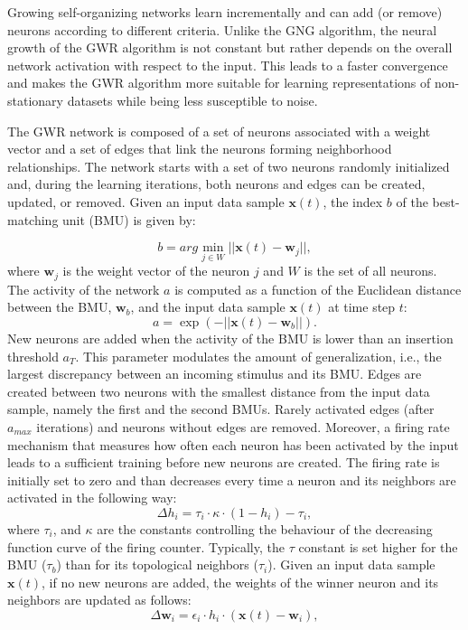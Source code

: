 \documentclass[5p,times]{elsarticle}
\begin{document}
Growing self-organizing networks learn incrementally and can add (or remove) neurons according to different criteria.
Unlike the GNG algorithm, the neural growth of the GWR algorithm is not constant but rather depends on the overall network activation with respect to the input. 
This leads to a faster convergence and makes the GWR algorithm more suitable for learning representations of non-stationary datasets while being less susceptible to noise.

The GWR network is composed of a set of neurons associated with a weight vector and a set of edges that link the neurons forming neighborhood relationships.
The network starts with a set of two neurons randomly initialized and, during the learning iterations, both neurons and edges can be created, updated, or removed.
Given an input data sample $\textbf{x}(t)$, the index $b$ of the best-matching unit (BMU) is given by:

\begin{equation}\label{eq:bmu}
b = arg \min\limits_{j \in W} ||\textbf{x}(t) - \textbf{w}_j||,
\end{equation}
where $\textbf{w}_j$ is the weight vector of the neuron $j$ and $W$ is the set of all neurons.
The activity of the network $a$ is computed as a function of the Euclidean distance between the BMU, $\textbf{w}_b$, and the input data sample $\textbf{x}(t)$ at time step $t$:
\begin{equation}\label{eq:activation}
a = \exp ( { - ||\textbf{x}(t) - \textbf{w}_b|| } ).
\end{equation}
\noindent New neurons are added when the activity of the BMU is lower than an insertion threshold $a_T$.
This parameter modulates the amount of generalization, i.e., the largest discrepancy between an incoming stimulus and its BMU.
Edges are created between two neurons with the smallest distance from the input data sample, namely the first and the second BMUs.
Rarely activated edges (after $a_{max}$ iterations) and neurons without edges are removed.
Moreover, a firing rate mechanism that measures how often each neuron has been activated by the input leads to a sufficient training before new neurons are created. 
The firing rate is initially set to zero and than decreases every time a neuron and its neighbors are activated in the following way:
\begin{equation}\label{eq:hab}
\Delta h_i = \tau_i \cdot \kappa \cdot (1 - h_i) - \tau_i,
\end{equation}
where $\tau_i$, and $\kappa$ are the constants controlling the behaviour of the decreasing function curve of the firing counter.
Typically, the $\tau$ constant is set higher for the BMU ($\tau_b$) than for its topological neighbors ($\tau_i$).
Given an input data sample $\textbf{x}(t)$, if no new neurons are added, the weights of the winner neuron and its neighbors are updated as follows:
\begin{equation}\label{eq:update}
\Delta\textbf{w}_i = \epsilon_i \cdot h_i \cdot (\textbf{x}(t) - \textbf{w}_i),
\end{equation}
\end{document}
